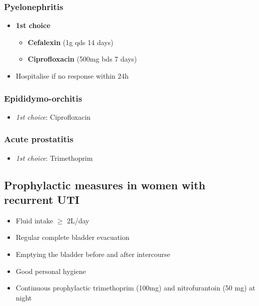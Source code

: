 \documentclass[
  12pt,
]{memoir}
\providecommand{\tightlist}{%
  \setlength{\itemsep}{0pt}\setlength{\parskip}{0pt}}
\begin{document}
\hypertarget{pyelonephritis}{%
\subsubsection{Pyelonephritis}\label{pyelonephritis}}

\begin{itemize}
\tightlist
\item
  \textbf{1st choice}

  \begin{itemize}
  \tightlist
  \item
    \textbf{Cefalexin} (1g qds 14 days)
  \item
    \textbf{Ciprofloxacin} (500mg bds 7 days)
  \end{itemize}
\item
  Hospitalise if no response within 24h
\end{itemize}

\hypertarget{epididymo-orchitis}{%
\subsubsection{Epididymo-orchitis}\label{epididymo-orchitis}}

\begin{itemize}
\tightlist
\item
  \emph{1st choice}: Ciprofloxacin
\end{itemize}

\hypertarget{acute-prostatitis}{%
\subsubsection{Acute prostatitis}\label{acute-prostatitis}}

\begin{itemize}
\tightlist
\item
  \emph{1st choice}: Trimethoprim
\end{itemize}

\hypertarget{prophylactic-measures-in-women-with-recurrent-uti}{%
\subsection{Prophylactic measures in women with recurrent
UTI}\label{prophylactic-measures-in-women-with-recurrent-uti}}

\begin{itemize}
\tightlist
\item
  Fluid intake \(\ge\) 2L/day
\item
  Regular complete bladder evacuation
\item
  Emptying the bladder before and after intercourse
\item
  Good personal hygiene
\item
  Continuous prophylactic trimethoprim (100mg) and nitrofurantoin (50
  mg) at night
\end{itemize}
\end{document}
